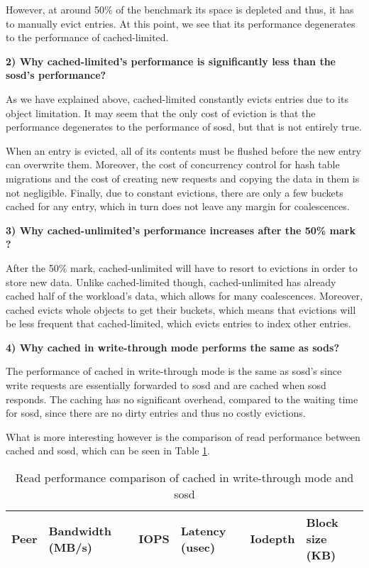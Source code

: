 However, at around 50\% of the benchmark its space is depleted and thus, it has 
to manually evict entries. At this point, we see that its performance 
degenerates to the performance of cached-limited.

\textbf{2) Why cached-limited's performance is significantly less than the 
	sosd's performance?}

As we have explained above, cached-limited constantly evicts entries due to its 
object limitation. It may seem that the only cost of eviction is that the 
performance degenerates to the performance of sosd, but that is not entirely 
true.

When an entry is evicted, all of its contents must be flushed before the new 
entry can overwrite them. Moreover, the cost of concurrency control for hash 
table migrations and the cost of creating new requests and copying the data in 
them is not negligible. Finally, due to constant evictions, there are only a 
few buckets cached for any entry, which in turn does not leave any margin for 
coalescences.

\textbf{3) Why cached-unlimited's performance increases after the 50\% mark ?}

After the 50\% mark, cached-unlimited will have to resort to evictions in order 
to store new data. Unlike cached-limited though, cached-unlimited has already 
cached half of the workload's data, which allows for many coalescences.  
Moreover, cached evicts whole objects to get their buckets, which means that 
evictions will be less frequent that cached-limited, which evicts entries to 
index other entries.

\textbf{4) Why cached in write-through mode performs the same as sods?}

The performance of cached in write-through mode is the same as sosd's since 
write requests are essentially forwarded to sosd and are cached when sosd 
responds. The caching has no significant overhead, compared to the waiting time 
for sosd, since there are no dirty entries and thus no costly evictions.

What is more interesting however is the comparison of read performance between 
cached and sosd, which can be seen in Table \ref{tab:writethrough}.

\begin{table}[H]
	\centering
	\begin{tabular}{ | l | l | l | l | l | l |}
		\hline
		Peer& Bandwidth (MB/s) & IOPS	& Latency (usec) & Iodepth & Block size 
		(KB) \\
		\hline \hline
		
		
	\end{tabular}
	\caption{Read performance comparison of cached in write-through mode and 
		sosd}
	\label{tab:writethrough}
\end{table}

